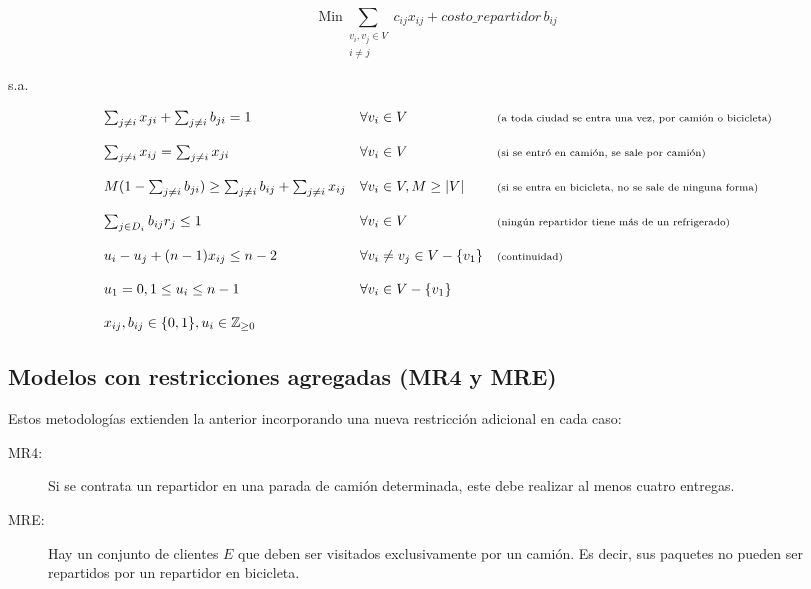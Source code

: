 \documentclass[10pt]{article}
\begin{document}
	\[
		\text{Min} \sum_{\substack{v_i, v_j \in V \\ i \neq j}} c_{ij} x_{ij} 
		+ costo\_repartidor\, b_{ij}
		\]

	s.a.

	\[
	\begin{array}{l l l}
		\sum_{j \neq i} x_{ji} + \sum_{j \neq i} b_{ji} = 1 & \forall v_i \in V & \text{\scriptsize (a toda ciudad se entra una vez, por camión o bicicleta)} \\
		\\
		\sum_{j \neq i} x_{ij} = \sum_{j\neq i} x_{ji} & \forall v_i \in V & \text{\scriptsize (si se entró en camión, se sale por camión)} \\
		\\
		M(1 - \sum_{j \neq i} b_{ji}) \geq \sum_{j \neq i} b_{ij} + \sum_{j \neq i} x_{ij} & \forall v_i \in V, M \geq |V| & \text{\scriptsize (si se entra en bicicleta, no se sale de ninguna forma)} \\
		\\
		\sum_{j \in D_i} b_{ij} r_j \leq 1 & \forall v_i \in V & \text{\scriptsize (ningún repartidor tiene más de un refrigerado)} \\
		\\
		u_i - u_j + (n - 1) x_{ij} \leq n - 2 & \forall v_i \neq v_j \in V - \{v_1\} & \text{\scriptsize (continuidad)} \\
		\\
		u_1 = 0, 1 \leq u_i \leq n-1 & \forall v_i \in V - \{v_1\} \\
		\\
		x_{ij}, b_{ij} \in \{0,1\}, u_i \in \mathbb{Z}_{\geq 0}
	\end{array}
	\]
	
	
	
	\subsection{Modelos con restricciones agregadas (MR4 y MRE)}
	
	Estos metodologías extienden la anterior incorporando una nueva restricción adicional en cada caso:
	
	\begin{description}
		\item[MR4:] Si se contrata un repartidor en una parada de camión determinada, este debe realizar al menos cuatro entregas.
		\item[MRE:] Hay un conjunto de clientes $E$ que deben ser visitados exclusivamente por un camión. Es decir, sus paquetes no pueden ser repartidos por un repartidor en bicicleta.
	\end{description}
	
\end{document}
